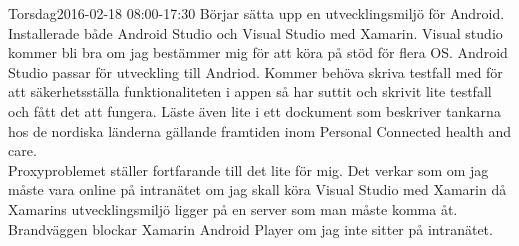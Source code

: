 \documentclass[a4paper,oneside]{book}
\begin{document}
\begin{diary}{Torsdag}{2016-02-18 08:00-17:30}
	Börjar sätta upp en utvecklingsmiljö för Android. Installerade både Android Studio och Visual Studio med Xamarin. Visual studio kommer bli bra om jag bestämmer mig för att köra på stöd för flera OS. Android Studio passar för utveckling till Andriod. Kommer behöva skriva testfall med för att säkerhetsställa funktionaliteten i appen så har suttit och skrivit lite testfall och fått det att fungera. Läste även lite i ett dockument som beskriver tankarna hos de nordiska länderna gällande framtiden inom Personal Connected health and care.\\
	Proxyproblemet ställer fortfarande till det lite för mig. Det verkar som om jag måste vara online på intranätet om jag skall köra Visual Studio med Xamarin då Xamarins utvecklingsmiljö ligger på en server som man måste komma åt. Brandväggen blockar Xamarin Android Player om jag inte sitter på intranätet.
\end{diary}
\end{document}
